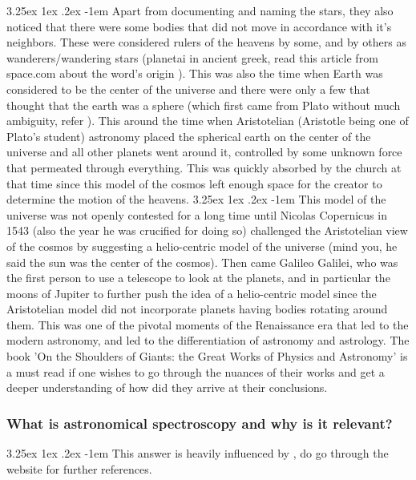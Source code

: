 \documentclass[a4paper,twoside,11pt]{article}
\makeatletter
\numberwithin{equation}{section}
\renewcommand\paragraph{\@startsection{paragraph}{5}{\z@}%
  {3.25ex \@plus1ex \@minus.2ex}%
  {-1em}%
  {\normalfont\normalsize\bfseries}}
\makeatother
\begin{document}
\paragraph{}
Apart from documenting and naming the stars, they also noticed that there were some bodies that did not move in accordance with it's neighbors. These were considered rulers of the heavens by some, and by others as wanderers/wandering stars (planetai in ancient greek, read this article from space.com about the word's origin \cite{Planets_1}). This was also the time when Earth was considered to be the center of the universe and there were only a few that thought that the earth was a sphere (which first came from Plato without much ambiguity, refer  \cite{wiki_planet_round}). This around the time when Aristotelian (Aristotle being one of Plato's student) astronomy placed the spherical earth on the center of the universe and all other planets went around it, controlled by some unknown force that permeated through everything. This was quickly absorbed by the church at that time since this model of the cosmos left enough space for the creator to determine the motion of the heavens.
\paragraph{}
This model of the universe was not openly contested for a long time until Nicolas Copernicus in 1543 (also the year he was crucified for doing so) challenged the Aristotelian view of the cosmos by suggesting a helio-centric model of the universe (mind you, he said the sun was the center of the cosmos). Then came Galileo Galilei, who was the first person to use a telescope to look at the planets, and in particular the moons of Jupiter to further push the idea of a helio-centric model since the Aristotelian model did not incorporate planets having bodies rotating around them. This  was one of the pivotal moments of the Renaissance era that led to the modern astronomy, and led to the differentiation of astronomy and astrology. The book 'On the Shoulders of Giants: the Great Works of Physics and Astronomy' \cite{OTSOG} is a must read if one wishes to go through the nuances of their works and get a deeper understanding of how did they arrive at their conclusions. 
\subsubsection{What is astronomical spectroscopy and why is it relevant?}
\paragraph{}
This answer is heavily influenced by \cite{ASHistory}, do go through the website for further references. 
\end{document}
